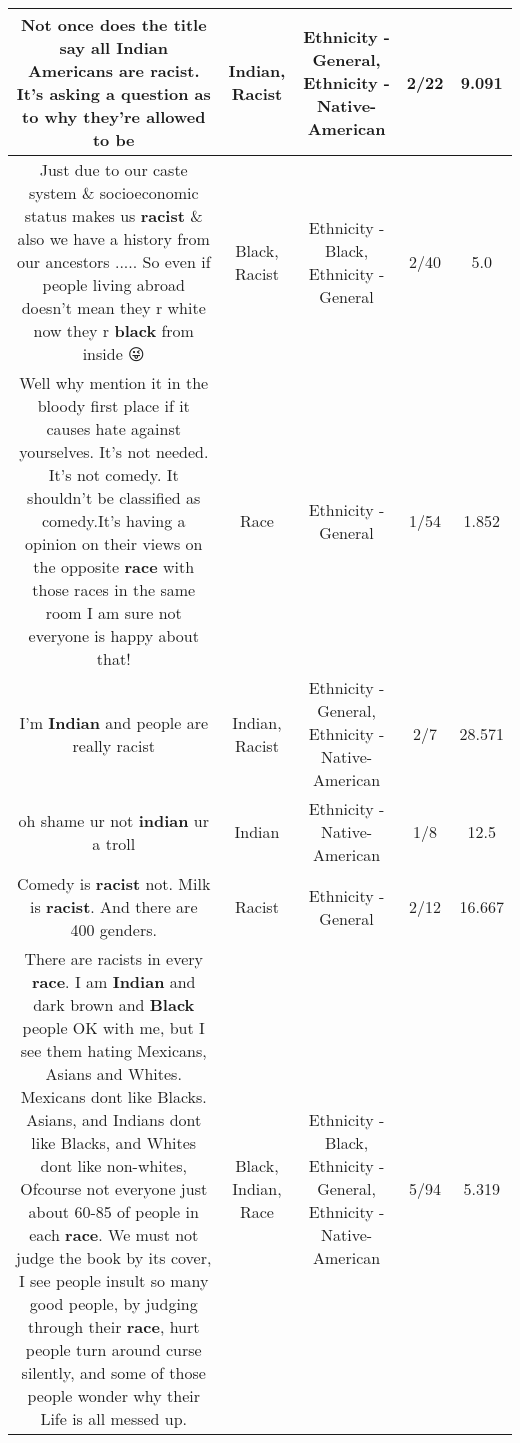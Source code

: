 \documentclass[11pt]{article}
\newlength\mylength
\begin{document}
\begin{center}
\begin{longtable}{|C{.65\mylength}|C{.30\mylength}|C{.12\mylength}|C{.12\mylength}|C{.12\mylength}|}
  \small Not once does the title say all \textbf{Indian} Americans are \textbf{racist}. It's asking a question as to why they're allowed to be\normalsize   & Indian, Racist & Ethnicity - General, Ethnicity - Native-American & 2/22 & 9.091 \\  \hline
  \small Just due to our caste system \& socioeconomic status makes us \textbf{racist} \& also we have a history from our ancestors ..... So even if  people living abroad doesn't mean they r white now they r \textbf{black} from inside 😜\normalsize   & Black, Racist & Ethnicity - Black, Ethnicity - General & 2/40 & 5.0 \\  \hline
  \small Well why mention it in the bloody first place if it causes hate against yourselves. It's not needed. It's not comedy. It shouldn't be classified as comedy.It's having a opinion on their views on the opposite \textbf{race} with those races in the same room I am sure not everyone is happy about that!\normalsize   & Race & Ethnicity - General & 1/54 & 1.852 \\  \hline
  \small I'm \textbf{Indian} and people are really racist\normalsize   & Indian, Racist & Ethnicity - General, Ethnicity - Native-American & 2/7 & 28.571 \\  \hline
  \small oh shame ur not \textbf{indian} ur a troll\normalsize   & Indian & Ethnicity - Native-American & 1/8 & 12.5 \\  \hline
  \small Comedy is \textbf{racist} not. Milk is \textbf{racist}. And there are 400 genders.\normalsize   & Racist & Ethnicity - General & 2/12 & 16.667 \\  \hline
  \small There are racists in every \textbf{race}.  I am  \textbf{Indian} and dark brown and \textbf{Black} people OK with me, but I see them hating Mexicans, Asians and Whites.  Mexicans dont like Blacks.  Asians, and  Indians dont like Blacks, and Whites dont like non-whites, Ofcourse not everyone just about 60-85 of people in each \textbf{race}. We must not judge the book by its cover,  I see people insult so many good people, by judging through their \textbf{race}, hurt people turn around  curse silently, and some of those people wonder why their Life is all messed up.\normalsize   & Black, Indian, Race & Ethnicity - Black, Ethnicity - General, Ethnicity - Native-American & 5/94 & 5.319 \\  \hline

\end{longtable}
\end{center}
\end{document}
